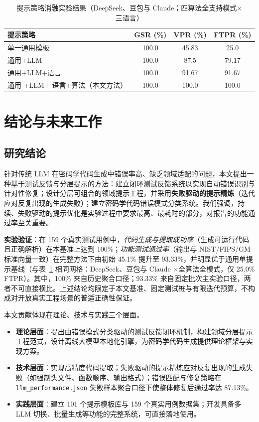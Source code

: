 \documentclass[12pt]{llncs}
\begin{document}
\begin{table}[H]
  \centering
  \caption{提示策略消融实验结果（DeepSeek、豆包与 Claude；四算法全支持模式$\times$三语言）}
  \label{tab:ablation_prompt}
  \setlength{\tabcolsep}{4pt}
  \begin{tabular}{l c c c}
    \toprule
    提示策略               & GSR (\%) & VPR (\%) & FTPR (\%) \\
    \midrule
    单一通用模板         & 100.0    & 45.83    & 25.0      \\
    通用+LLM              & 100.0    & 87.5     & 79.17     \\
    通用+LLM+语言        & 100.0    & 91.67    & 91.67     \\
    通用 +LLM+ 语言+算法（本文方法） & 100.0 & 100.0 & 100.0 \\
    \bottomrule
  \end{tabular}
\end{table}

\section{结论与未来工作}
\subsection{研究结论}
针对传统 LLM 在密码学代码生成中错误率高、缺乏领域适配的问题，本文提出一种基于测试反馈与分层提示的方法：建立闭环测试反馈系统以实现自动错误识别与针对性修复；设计分层可组合的领域提示工程，并采用\textbf{失败驱动的提示精炼}（迭代应对反复出现的生成失败）；建立密码学代码错误模式分类系统。我们强调，持续、失败驱动的提示优化是实验过程中要求最高、最耗时的部分，对报告的功能通过率至关重要。

\textbf{实验验证}：在 159 个真实测试用例中，\emph{代码生成与提取成功率}（生成可运行代码且正确解析）在本基准上达到 100\%；\emph{功能测试通过率}（输出与 NIST/FIPS/GM 标准向量一致）在完整方法下由初始 45.1\% 提升至 93.33\%，并明显优于通用单提示基线（与表~\ref{tab:ablation_prompt} 相同网格：DeepSeek、豆包与 Claude ×全算法全模式，仅 25.0\% FTPR）。其中，100\% 来自历史聚合口径；93.33\% 来自固定批次主实验口径，两者不可直接横比。上述结论均限定于本文基准、固定测试桩与有限迭代预算，不构成对开放真实工程场景的普适正确性保证。

本文贡献体现在理论、技术与实践三个层面。
\begin{itemize}
    \item \textbf{理论层面}：提出由错误模式分类驱动的测试反馈闭环机制，构建领域分层提示工程范式，设计离线大模型本地化引擎，为密码学代码生成提供理论框架与实现方案。
    \item \textbf{技术层面}：实现高精度代码提取；失败驱动的提示精炼应对反复出现的生成失败（如强制头文件、函数顺序、输出格式）；错误匹配与修复策略在 \texttt{llm\_performance.json} 失败样本聚合口径下使整体修复后通过率达 87.13\%。
    \item \textbf{实践层面}：建立 101 个提示模板库与 159 个真实用例数据集；开发具备多 LLM 切换、批量生成等功能的完整系统，可直接落地使用。
\end{itemize}
\end{document}
